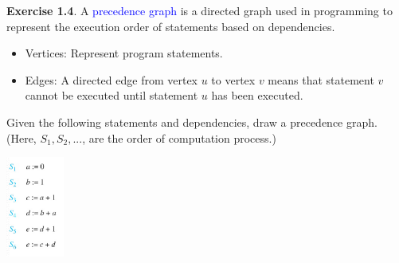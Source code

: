 \documentclass[aspectratio=169]{beamer}
\providecommand{\Blue}[1]{\textcolor{blue}{#1}}
\begin{document}
\begin{frame}[plain]{}

{\bf Exercise 1.4}. 
A  \Blue{ precedence graph} is a directed graph used in programming to represent the execution order of statements based on dependencies.

  \begin{itemize}
   \item Vertices: Represent program statements.
   \item Edges: A directed edge from vertex  $u$  to vertex $ v$  means that statement  $v$  cannot be executed until statement  $u$  has been executed.
 \end{itemize}
 
 Given the following statements and dependencies, draw a precedence graph. (Here, $S_1, S_2, ...$, are the order of computation process.)
 \medskip
 
	\hspace{.2in}     \includegraphics[height=3.3cm]{./img/lecture1-fig3a.png} %


\end{frame}
\end{document}
